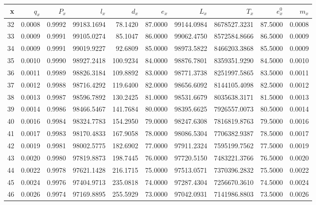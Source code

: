 \documentclass[11pt]{article}
\begin{document}
 \begin{tabular}{|r|r|r|r|r|r|r|r|r|r|}
	\hline
	\textbf{x} &     \textbf{$q_{x}$} &     \textbf{$P_{x}$} &          \textbf{$l_{x}$} &        \textbf{$d_{x}$} &       \textbf{$e_{x}$} &         \textbf{$L_{x}$} &            \textbf{$T_{x}$} &      \textbf{$e_{x}^{ 0}$} &      \textbf{$m_{x}$} \\
	\hline
  32 & 0.0008 & 0.9992 &  99183.1694 &   78.1420 &  87.0000 & 99144.0984 &  8678527.3231 &  87.5000 & 0.0008 \\
33 & 0.0009 & 0.9991 &  99105.0274 &   85.1047 &  86.0000 & 99062.4750 &  8572584.8666 &  86.5000 & 0.0009 \\
34 & 0.0009 & 0.9991 &  99019.9227 &   92.6809 &  85.0000 & 98973.5822 &  8466203.3868 &  85.5000 & 0.0009 \\
35 & 0.0010 & 0.9990 &  98927.2418 &  100.9234 &  84.0000 & 98876.7801 &  8359351.9290 &  84.5000 & 0.0010 \\
36 & 0.0011 & 0.9989 &  98826.3184 &  109.8892 &  83.0000 & 98771.3738 &  8251997.5865 &  83.5000 & 0.0011 \\
37 & 0.0012 & 0.9988 &  98716.4292 &  119.6400 &  82.0000 & 98656.6092 &  8144105.4098 &  82.5000 & 0.0012 \\
38 & 0.0013 & 0.9987 &  98596.7892 &  130.2425 &  81.0000 & 98531.6679 &  8035638.3171 &  81.5000 & 0.0013 \\
39 & 0.0014 & 0.9986 &  98466.5467 &  141.7684 &  80.0000 & 98395.6625 &  7926557.0073 &  80.5000 & 0.0014 \\
40 & 0.0016 & 0.9984 &  98324.7783 &  154.2950 &  79.0000 & 98247.6308 &  7816819.8763 &  79.5000 & 0.0016 \\
41 & 0.0017 & 0.9983 &  98170.4833 &  167.9058 &  78.0000 & 98086.5304 &  7706382.9387 &  78.5000 & 0.0017 \\
42 & 0.0019 & 0.9981 &  98002.5775 &  182.6902 &  77.0000 & 97911.2324 &  7595199.7562 &  77.5000 & 0.0019 \\
43 & 0.0020 & 0.9980 &  97819.8873 &  198.7445 &  76.0000 & 97720.5150 &  7483221.3766 &  76.5000 & 0.0020 \\
44 & 0.0022 & 0.9978 &  97621.1428 &  216.1715 &  75.0000 & 97513.0571 &  7370396.2832 &  75.5000 & 0.0022 \\
45 & 0.0024 & 0.9976 &  97404.9713 &  235.0818 &  74.0000 & 97287.4304 &  7256670.3610 &  74.5000 & 0.0024 \\
46 & 0.0026 & 0.9974 &  97169.8895 &  255.5929 &  73.0000 & 97042.0931 &  7141986.8803 &  73.5000 & 0.0026 \\

\end{tabular}
\end{document}
